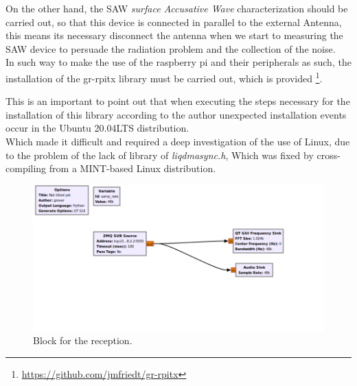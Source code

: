 \documentclass[12pt, twoside]{report}
\begin{document}
On the other hand, the SAW \textit{surface Accusative Wave} characterization should be carried out, so that  this device is connected in parallel to the external Antenna, this means its necessary disconnect the antenna when we start to measuring the SAW device to persuade the radiation problem and the collection of the noise.\\
In such way to make the use of the raspberry pi and their peripherals as such, the installation of the gr-rpitx library must be carried out, which is provided \footnote{\url{https://github.com/jmfriedt/gr-rpitx}}. 

This is an important to point out that when executing the steps necessary for the installation of this library according to the author unexpected installation events occur in the Ubuntu 20.04LTS distribution.\\ 
Which made it difficult and required a deep investigation of the use of Linux, due to the problem of the lack of library of \textit{liqdmasync.h}, Which was fixed by cross-compiling from a MINT-based Linux distribution.

\begin{figure}[!h]
\centering
  \includegraphics[width=\linewidth]{images/ZMQ_1A.png}
  \caption{Block for the reception.}
  \label{fig:ZMQ1}
\end{figure}
\end{document}
